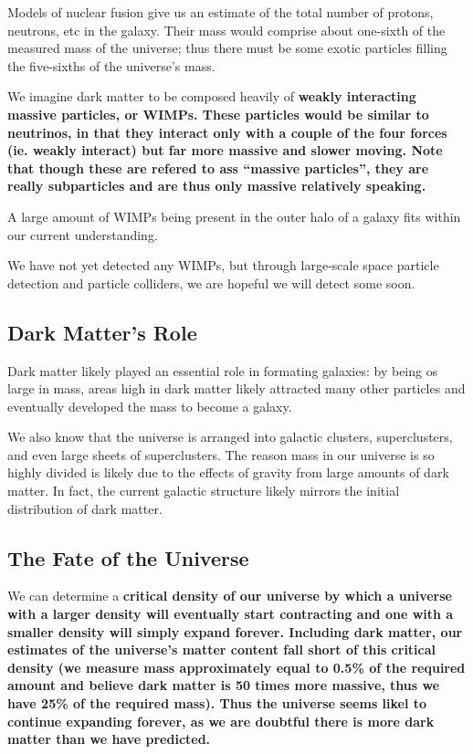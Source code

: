Models of nuclear fusion give us an estimate of the total number of protons, neutrons, etc in the galaxy. Their mass would comprise about one-sixth of the measured mass of the universe; thus there must be some exotic particles filling the five-sixths of the universe's mass.

We imagine dark matter to be composed heavily of \bf{weakly interacting massive particles}, or \bf{WIMPs}. These particles would be similar to neutrinos, in that they interact only with a couple of the four forces (ie. weakly interact) but far more massive and slower moving. Note that though these are refered to ass ``massive particles'', they are really subparticles and are thus only massive relatively speaking.

A large amount of WIMPs being present in the outer halo of a galaxy fits within our current understanding.

We have not yet detected any WIMPs, but through large-scale space particle detection and particle colliders, we are hopeful we will detect some soon.

\subsection{Dark Matter's Role}
Dark matter likely played an essential role in formating galaxies: by being os large in mass, areas high in dark matter likely attracted many other particles and eventually developed the mass to become a galaxy.

We also know that the universe is arranged into galactic clusters, superclusters, and even large sheets of superclusters. The reason mass in our universe is so highly divided is likely due to the effects of gravity from large amounts of dark matter. In fact, the current galactic structure likely mirrors the initial distribution of dark matter.

\subsection{The Fate of the Universe}
We can determine a \bf{critical density} of our universe by which a universe with a larger density will eventually start contracting and one with a smaller density will simply expand forever. Including dark matter, our estimates of the universe's matter content fall short of this critical density (we measure mass approximately equal to 0.5\% of the required amount and believe dark matter is 50 times more massive, thus we have 25\% of the required mass). Thus the universe seems likel to continue expanding forever, as we are doubtful there is more dark matter than we have predicted.

